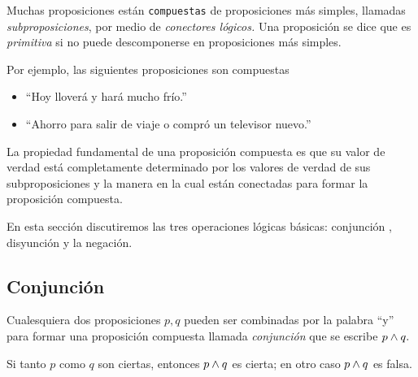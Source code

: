     Muchas proposiciones están \texttt{compuestas} de proposiciones más simples, llamadas \emph{subproposiciones}, por medio de \emph{conectores lógicos.}  Una proposición se dice que es \emph{primitiva} si no puede descomponerse en proposiciones más simples.



    Por ejemplo, las siguientes proposiciones son compuestas
    \begin{itemize}
        \item ``Hoy lloverá y hará mucho frío.''
        \item ``Ahorro para salir de viaje o compró un televisor nuevo.''
    \end{itemize}
    



    La propiedad fundamental de una proposición compuesta es que su valor de verdad está completamente determinado por los valores de verdad de sus subproposiciones y la manera en la cual están conectadas para formar la proposición compuesta. 


    En esta sección discutiremos las tres operaciones lógicas básicas: conjunción , disyunción  y la negación.


\subsection{Conjunción}


    Cualesquiera dos proposiciones $p,q$ pueden ser combinadas por la palabra ``y'' para formar una proposición compuesta llamada \emph{conjunción} que se escribe $p\wedge q.$



    \begin{definicion}
        Si tanto $p$ como $q$ son ciertas, entonces $p \wedge q$ es cierta; en otro caso $p\wedge q$ es falsa.
    \end{definicion}	

